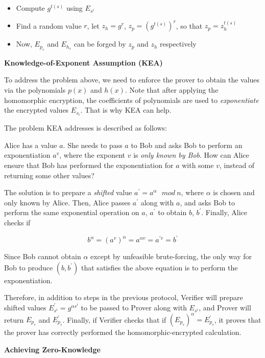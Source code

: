 \documentclass[
]{report}
\begin{document}
\begin{itemize}
\item
  Compute \(g^{t(s)}\) using \(E_{s^{i}}\)
\item
  Find a random value \(r\), let \(z_{h} = g^{r}\),
  \(z_{p} = \left( g^{t(s)} \right)^{r}\), so that
  \(z_{p} = z_{h}^{t(s)}\)
\item
  Now, \(E_{p_{s}}\) and \(E_{h_{s}}\) can be forged by \(z_{p}\) and
  \(z_{h}\) respectively
\end{itemize}

\textbf{Knowledge-of-Exponent Assumption (KEA)}

To address the problem above, we need to enforce the prover to obtain
the values via the polynomials \(p(x)\) and \(h(x)\). Note that after
applying the homomorphic encryption, the coefficients of polynomials are
used to \emph{exponentiate} the encrypted values \(E_{s_{i}}\). That is
why KEA can help.

The problem KEA addresses is described as follows:

Alice has a value \(a\). She needs to pass \(a\) to Bob and asks Bob to
perform an exponentiation \(a^{v}\), where the exponent \(v\) is
\emph{only known by Bob}. How can Alice ensure that Bob has performed
the exponentiation for \(a\) with some \(v\), instead of returning some
other values?

The solution is to prepare a \emph{shifted} value
\(a^{'} = a^{\alpha}\ \ \ mod\ n\), where \(\alpha\) is chosen and only
known by Alice. Then, Alice passes \(a^{'}\) along with \(a\), and asks
Bob to perform the same exponential operation on \(a\), \(a^{'}\) to
obtain \(b\), \(b^{'}\). Finally, Alice checks if

\[b^{\alpha} = \left( a^{v} \right)^{\alpha} = a^{\alpha v} = a^{'v} = b^{'}\]

Since Bob cannot obtain \(\alpha\) except by unfeasible brute-forcing,
the only way for Bob to produce \(\left( b,b^{'} \right)\) that
satisfies the above equation is to perform the exponentiation.

Therefore, in addition to steps in the previous protocol, Verifier will
prepare shifted values \(E_{s^{i}}^{'} = g^{\alpha s^{i}}\) to be passed
to Prover along with \(E_{s^{i}}\), and Prover will return \(E_{p_{s}}\)
and \(E_{p_{s}}^{'}\). Finally, if Verifier checks that if
\(\left( E_{p_{s}} \right)^{\alpha} = E_{p_{s}}^{'}\), it proves that
the prover has correctly performed the homomorphic-encrypted
calculation.

\textbf{Achieving Zero-Knowledge}
\end{document}
